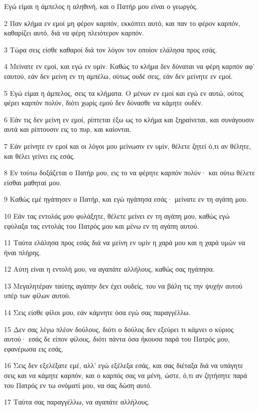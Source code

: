\par Εγώ είμαι η άμπελος η αληθινή, και ο Πατήρ μου είναι ο γεωργός.
\par 2 Παν κλήμα εν εμοί μη φέρον καρπόν, εκκόπτει αυτό, και παν το φέρον καρπόν, καθαρίζει αυτό, διά να φέρη πλειότερον καρπόν.
\par 3 Τώρα σεις είσθε καθαροί διά τον λόγον τον οποίον ελάλησα προς εσάς.
\par 4 Μείνατε εν εμοί, και εγώ εν υμίν. Καθώς το κλήμα δεν δύναται να φέρη καρπόν αφ' εαυτού, εάν δεν μείνη εν τη αμπέλω, ούτως ουδέ σεις, εάν δεν μείνητε εν εμοί.
\par 5 Εγώ είμαι η άμπελος, σεις τα κλήματα. Ο μένων εν εμοί και εγώ εν αυτώ, ούτος φέρει καρπόν πολύν, διότι χωρίς εμού δεν δύνασθε να κάμητε ουδέν.
\par 6 Εάν τις δεν μείνη εν εμοί, ρίπτεται έξω ως το κλήμα και ξηραίνεται, και συνάγουσιν αυτά και ρίπτουσιν εις το πυρ, και καίονται.
\par 7 Εάν μείνητε εν εμοί και οι λόγοι μου μείνωσιν εν υμίν, θέλετε ζητεί ό,τι αν θέλητε, και θέλει γείνει εις εσάς.
\par 8 Εν τούτω δοξάζεται ο Πατήρ μου, εις το να φέρητε καρπόν πολύν· και ούτω θέλετε είσθαι μαθηταί μου.
\par 9 Καθώς εμέ ηγάπησεν ο Πατήρ, και εγώ ηγάπησα εσάς· μείνατε εν τη αγάπη μου.
\par 10 Εάν τας εντολάς μου φυλάξητε, θέλετε μείνει εν τη αγάπη μου, καθώς εγώ εφύλαξα τας εντολάς του Πατρός μου και μένω εν τη αγάπη αυτού.
\par 11 Ταύτα ελάλησα προς εσάς διά να μείνη εν υμίν η χαρά μου και η χαρά υμών να ήναι πλήρης.
\par 12 Αύτη είναι η εντολή μου, να αγαπάτε αλλήλους, καθώς σας ηγάπησα.
\par 13 Μεγαλητέραν ταύτης αγάπην δεν έχει ουδείς, του να βάλη τις την ψυχήν αυτού υπέρ των φίλων αυτού.
\par 14 Σεις είσθε φίλοι μου, εάν κάμνητε όσα εγώ σας παραγγέλλω.
\par 15 Δεν σας λέγω πλέον δούλους, διότι ο δούλος δεν εξεύρει τι κάμνει ο κύριος αυτού· εσάς δε είπον φίλους, διότι πάντα όσα ήκουσα παρά του Πατρός μου, εφανέρωσα εις εσάς.
\par 16 Σεις δεν εξελέξατε εμέ, αλλ' εγώ εξέλεξα εσάς, και σας διέταξα διά να υπάγητε σεις και να κάμητε καρπόν, και ο καρπός σας να μένη, ώστε, ό,τι αν ζητήσητε παρά του Πατρός εν τω ονόματί μου, να σας δώση αυτό.
\par 17 Ταύτα σας παραγγέλλω, να αγαπάτε αλλήλους.
